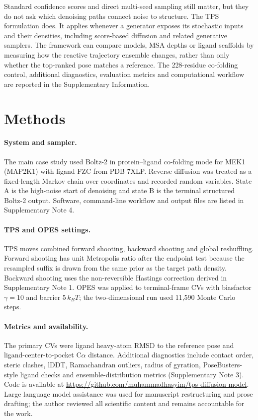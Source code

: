 \documentclass[aps,prl,twocolumn,superscriptaddress,floatfix]{revtex4-2}
\begin{document}
Standard confidence scores and direct multi-seed sampling still matter, but
they do not ask which denoising paths connect noise to structure. The TPS
formulation does. It applies whenever a generator exposes its stochastic
inputs and their densities, including score-based diffusion and related
generative samplers. The framework can compare models, MSA depths or ligand
scaffolds by measuring how the reactive trajectory ensemble changes, rather
than only whether the top-ranked pose matches a reference. The 228-residue
co-folding control, additional diagnostics, evaluation metrics and
computational workflow are reported in the Supplementary Information.

\section*{Methods}

\paragraph{System and sampler.}
The main case study used Boltz-2 in protein--ligand co-folding mode for MEK1
(MAP2K1) with ligand FZC from PDB 7XLP. Reverse diffusion was treated as a
fixed-length Markov chain over coordinates and recorded random variables. State
A is the high-noise start of denoising and state B is the terminal structured
Boltz-2 output. Software, command-line workflow and output files are listed in
Supplementary Note 4.

\paragraph{TPS and OPES settings.}
TPS moves combined forward shooting, backward shooting and global reshuffling.
Forward shooting has unit Metropolis ratio after the endpoint test because the
resampled suffix is drawn from the same prior as the target path density.
Backward shooting uses the non-reversible Hastings correction derived in
Supplementary Note 1. OPES was applied to terminal-frame CVs with biasfactor
$\gamma=10$ and barrier $5\,k_BT$; the two-dimensional run used 11,590 Monte
Carlo steps.

\paragraph{Metrics and availability.}
The primary CVs were ligand heavy-atom RMSD to the reference pose and
ligand-center-to-pocket C$\alpha$ distance. Additional diagnostics include
contact order, steric clashes, lDDT, Ramachandran outliers, radius of gyration,
PoseBusters-style ligand checks and ensemble-distribution metrics
(Supplementary Note 3). Code is available at
\url{https://github.com/muhammadhasyim/tps-diffusion-model}. Large language
model assistance was used for manuscript restructuring and prose drafting; the
author reviewed all scientific content and remains accountable for the work.
\end{document}
